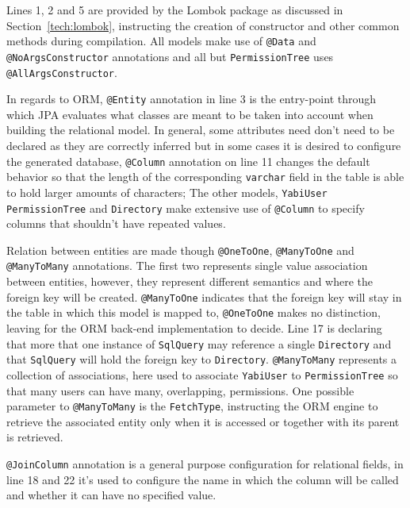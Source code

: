 Lines 1, 2 and 5 are provided by the Lombok package as discussed in Section~\ref{tech:lombok}, instructing the creation of constructor and other common methods during compilation. All models make use of \texttt{@Data} and \texttt{@NoArgsConstructor} annotations and all but \texttt{PermissionTree} uses \texttt{@AllArgsConstructor}.

In regards to \gls{ORM}, \texttt{@Entity} annotation in line 3 is the entry-point through which \gls{JPA} evaluates what classes are meant to be taken into account when building the relational model.
In general, some attributes need don't need to be declared as they are correctly inferred but in some cases it is desired to configure the generated database, \texttt{@Column} annotation on line 11 changes the default behavior so that the length of the corresponding \texttt{varchar} field in the table is able to hold larger amounts of characters; The other models, \texttt{YabiUser} \texttt{PermissionTree} and \texttt{Directory} make extensive use of \texttt{@Column} to specify columns that shouldn't have repeated values.

Relation between entities are made though \texttt{@OneToOne}, \texttt{@ManyToOne} and \texttt{@ManyToMany} annotations.
The first two represents single value association between entities, however, they represent different semantics and where the foreign key will be created.
\texttt{@ManyToOne} indicates that the foreign key will stay in the table in which this model is mapped to, \texttt{@OneToOne} makes no distinction, leaving for the \gls{ORM} back-end implementation to decide.
Line 17 is declaring that more that one instance of \texttt{SqlQuery} may reference a single \texttt{Directory} and that \texttt{SqlQuery} will hold the foreign key to \texttt{Directory}.
\texttt{@ManyToMany} represents a collection of associations, here used to associate \texttt{YabiUser} to \texttt{PermissionTree} so that many users can have many, overlapping, permissions. One possible parameter to \texttt{@ManyToMany} is the \texttt{FetchType}, instructing the \gls{ORM} engine to retrieve the associated entity only when it is accessed or together with its parent is retrieved.

\texttt{@JoinColumn} annotation is a general purpose configuration for relational fields, in line 18 and 22 it's used to configure the name in which the column will be called and whether it can have no specified value.



